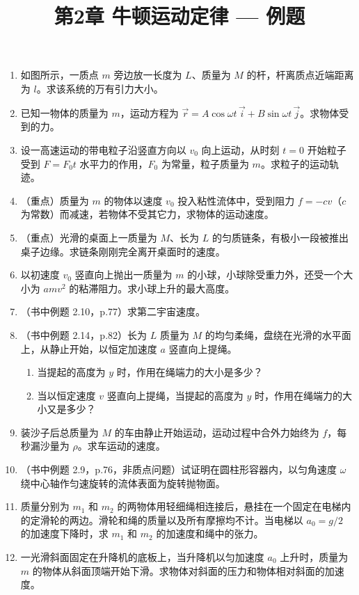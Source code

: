 \documentclass{ctexart}
\title{\textbf{第2章 牛顿运动定律} --- 例题}
\author{}
\date{}
\begin{document}
\maketitle

\begin{enumerate}

\item 如图所示，一质点 $m$ 旁边放一长度为 $L$、质量为 $M$ 的杆，杆离质点近端距离为 $l$。求该系统的万有引力大小。

\item 已知一物体的质量为 $m$，运动方程为 $\vec{r} = A\cos\omega t\,\vec{i} + B\sin\omega t\,\vec{j}$。求物体受到的力。

\item 设一高速运动的带电粒子沿竖直方向以 $v_0$ 向上运动，从时刻 $t=0$ 开始粒子受到 $F = F_0 t$ 水平力的作用，$F_0$ 为常量，粒子质量为 $m$。求粒子的运动轨迹。

\item（重点）质量为 $m$ 的物体以速度 $v_0$ 投入粘性流体中，受到阻力 $f = -cv$（$c$ 为常数）而减速，若物体不受其它力，求物体的运动速度。

\item（重点）光滑的桌面上一质量为 $M$、长为 $L$ 的匀质链条，有极小一段被推出桌子边缘。求链条刚刚完全离开桌面时的速度。

\item 以初速度 $v_0$ 竖直向上抛出一质量为 $m$ 的小球，小球除受重力外，还受一个大小为 $amv^{2}$ 的粘滞阻力。求小球上升的最大高度。

\item（书中例题 2.10，p.77）求第二宇宙速度。

\item（书中例题 2.14，p.82）长为 $L$ 质量为 $M$ 的均匀柔绳，盘绕在光滑的水平面上，从静止开始，以恒定加速度 $a$ 竖直向上提绳。
\begin{enumerate}
  \item 当提起的高度为 $y$ 时，作用在绳端力的大小是多少？
  \item 当以恒定速度 $v$ 竖直向上提绳，当提起的高度为 $y$ 时，作用在绳端力的大小又是多少？
\end{enumerate}

\item 装沙子后总质量为 $M$ 的车由静止开始运动，运动过程中合外力始终为 $f$，每秒漏沙量为 $\rho$。求车运动的速度。

\item（书中例题 2.9，p.76，非质点问题）试证明在圆柱形容器内，以匀角速度 $\omega$ 绕中心轴作匀速旋转的流体表面为旋转抛物面。

\item 质量分别为 $m_1$ 和 $m_2$ 的两物体用轻细绳相连接后，悬挂在一个固定在电梯内的定滑轮的两边。滑轮和绳的质量以及所有摩擦均不计。当电梯以 $a_0 = g/2$ 的加速度下降时，求 $m_1$ 和 $m_2$ 的加速度和绳中的张力。

\item 一光滑斜面固定在升降机的底板上，当升降机以匀加速度 $a_0$ 上升时，质量为 $m$ 的物体从斜面顶端开始下滑。求物体对斜面的压力和物体相对斜面的加速度。

\end{enumerate}
\end{document}
